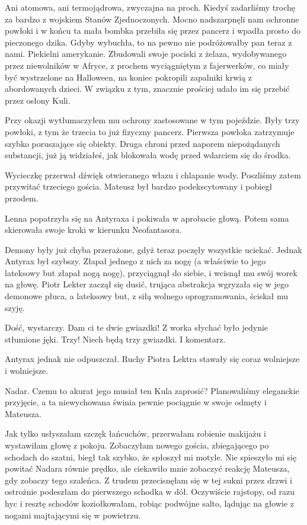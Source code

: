 Ani atomowa, ani termojądrowa, zwyczajna na proch. Kiedyś zadarliśmy trochę za bardzo z wojskiem Stanów Zjednoczonych. 
Mocno nadszarpnęli nam ochronne powłoki i w końcu ta mała bombka przebiła się przez pancerz i wpadła prosto do pieczonego dzika.
Gdyby wybuchła, to na pewno nie podróżowałby pan teraz z nami.
Piekielni amerykanie. Zbudowali swoje pociski z żelaza, wydobywanego przez niewolników w Afryce,
z prochem wyciągniętym z fajerwerków, co miały być wystrzelone na Halloween, na koniec pokropili zapalniki krwią z abordowanych dzieci.
W związku z tym, znacznie prościej udało im się przebić przez osłony Kuli.

Przy okazji wytłumaczyłem mu ochrony zastosowane w tym pojeździe. Były trzy powłoki, z tym że trzecia to już fizyczny pancerz. 
Pierwsza powłoka zatrzymuje szybko poruszające się obiekty.
Druga chroni przed naporem niepożądanych substancji, już ją widziałeś, jak blokowała wodę przed wdarciem się do środka.

Wycieczkę przerwał dźwięk otwieranego włazu i chlapanie wody.
Poszliśmy zatem przywitać trzeciego gościa. Mateusz był bardzo podekscytowany i pobiegł przodem.

\divider{}

Lenna popatrzyła się na Antyraxa i pokiwała w aprobacie głową.
Potem sama skierowała swoje kroki w kierunku Neofantasora.

Demony były już chyba przerażone, gdyż teraz poczęły wszystkie uciekać.
Jednak Antyrax był szybszy. Złapał jednego z nich za nogę (a właściwie to jego lateksowy but złapał nogą nogę), przyciągnął do siebie, i wcisnął mu swój worek na głowę.
Piotr Lekter zaczął się dusić, trująca abstrakcja wgryzała się w jego demonowe płuca, a lateksowy but, z siłą wolnego oprogramowania, ściskał mu szyję.

\ds{} Dość, wystarczy. Dam ci te dwie gwiazdki! \dm{} Z worka słychać było jedynie stłumione jęki. \dm{} Trzy! Niech będą trzy gwiazdki. I komentarz. \de{}

Antyrax jednak nie odpuszczał. Ruchy Piotra Lektra stawały się coraz wolniejsze i wolniejsze.

\divider{}

Nadar. Czemu to akurat jego musiał ten Kula zaprosić?
Planowaliśmy eleganckie przyjęcie, a ta niewychowana świnia pewnie pociągnie w swoje odmęty i Mateusza.

Jak tylko usłyszałam szczęk łańcuchów, przerwałam robienie makijażu i wystawiłam głowę z pokoju.
Zobaczyłam nowego gościa, zbiegającego po schodach do szatni, biegł tak szybko, że spłoszył mi motyle.
Nie spieszyło mi się powitać Nadara równie prędko, ale ciekawiło mnie zobaczyć reakcję Mateusza, gdy zobaczy tego szaleńca.
Z trudem przecisnęłam się w tej sukni przez drzwi i ostrożnie podeszłam do pierwszego schodka w dół.
Oczywiście rajstopy, od razu hyc i resztę schodów koziołkowałam, robiąc podwójne salto, lądując na głowie z nogami majtającymi się w powietrzu.

